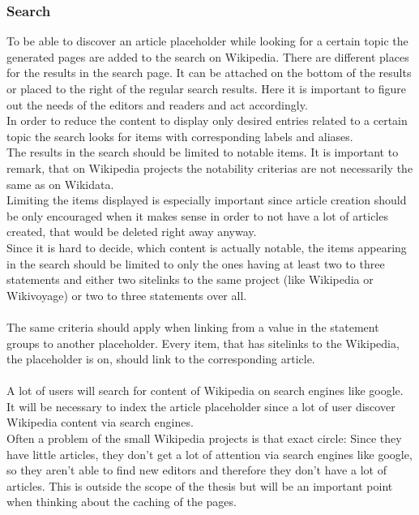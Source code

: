 \documentclass[11pt]{article}
\begin{document}
\subsubsection{Search}
To be able to discover an article placeholder while looking for a certain topic the generated pages are added to the search on Wikipedia. There are different places for the results in the search page. It can be attached on the bottom of the results or placed to the right of the regular search results. Here it is important to figure out the needs of the editors and readers and act accordingly. \\
In order to reduce the content to display only desired entries related to a certain topic the search looks for items with corresponding labels and aliases.  \\
The results in the search should be limited to notable items. It is important to remark, that on Wikipedia projects the notability criterias are not necessarily the same as on Wikidata. \\
Limiting the items displayed is especially important since article creation should be only encouraged when it makes sense in order to not have a lot of articles created, that would be deleted right away anyway.\\
Since it is hard to decide, which content is actually notable, the items appearing in the search should be limited to only the ones having at least two to three statements and either two sitelinks to the same project (like Wikipedia or Wikivoyage) or two to three statements over all. \\
\\
The same criteria should apply when linking from a value in the statement groups to another placeholder. Every item, that has sitelinks to the Wikipedia, the placeholder is on, should link to the corresponding article.  \\
\\
A lot of users will search for content of Wikipedia on search engines like google. It will be necessary to index the article placeholder since a lot of user discover Wikipedia content via search engines.  \\
Often a problem of the small Wikipedia projects is that exact circle: Since they have little articles, they don't get a lot of attention via search engines like google, so they aren't able to find new editors and therefore they don't have a lot of articles. 
This is outside the scope of the thesis but will be an important point when thinking about the caching of the pages. 
\end{document}
